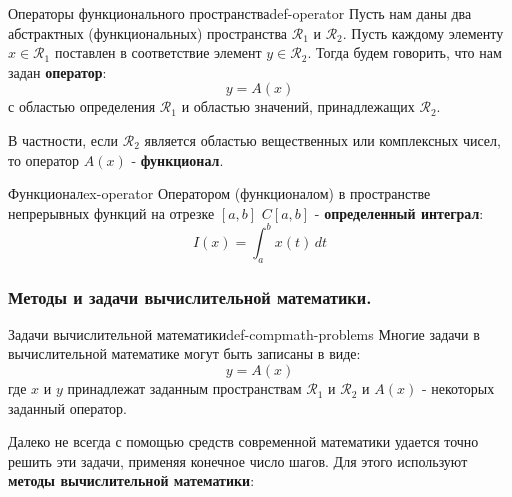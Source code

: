 \documentclass[14pt]{extarticle}
\begin{document}
        \begin{definition}{Операторы функционального пространства}{def-operator}
            Пусть нам даны два абстрактных (функциональных) пространства $\mathscr{R}_{1}$ и $\mathscr{R}_{2}$. Пусть каждому элементу $x \in \mathscr{R}_{1}$ поставлен в соответствие элемент $y \in \mathscr{R}_{2}$. Тогда будем говорить, что нам задан \textbf{оператор}:\\
            $$y = A(x)$$
            с областью определения $\mathscr{R}_{1}$ и областью значений, принадлежащих $\mathscr{R}_{2}$.

            \vspace{\baselineskip}

            В частности, если $\mathscr{R}_{2}$ является областью вещественных или комплексных чисел, то оператор $A(x)$ - \textbf{функционал}.
        \end{definition}

        \begin{example}{Функционал}{ex-operator}
            Оператором (функционалом) в пространстве непрерывных функций на отрезке $[a, b]$ $C[a, b]$ - \textbf{определенный интеграл}:
            $$I(x) = \int_{a}^{b} x(t) \, dt$$
        \end{example}

    \subsubsection{Методы и задачи вычислительной математики.}

        \begin{definition}{Задачи вычислительной математики}{def-compmath-problems}
            Многие задачи в вычислительной математике могут быть записаны в виде:
            $$y = A(x)$$
            где $x$ и $y$ принадлежат заданным пространствам $\mathscr{R}_{1}$ и $\mathscr{R}_{2}$ и $A(x)$ - некоторых заданный оператор.
        \end{definition}

        Далеко не всегда с помощью средств современной математики удается точно решить эти задачи, применяя конечное число шагов. Для этого используют \textbf{методы вычислительной математики}:
\end{document}

